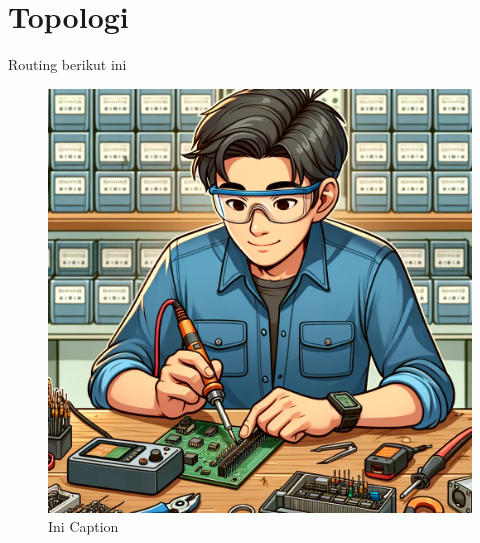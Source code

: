 \section*{Topologi} %

Routing berikut ini \lipsum[1]

\begin{figure}[H]
    \centering
    \includegraphics[width=0.2\linewidth]{img/contohgambar.png}
    \caption{Ini Caption}
    \label{fig:initopologi}
\end{figure}

